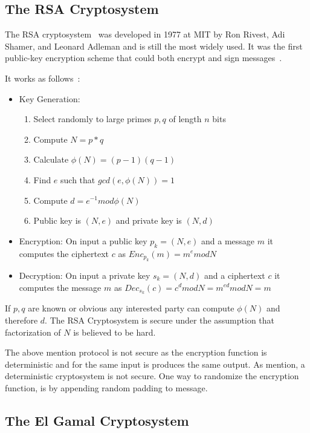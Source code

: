 \subsection{The RSA Cryptosystem}
\label{preliminaries:pub:rsa}

The RSA cryptosystem~\cite{rsa} was developed in 1977 at MIT by Ron Rivest, Adi Shamer, and Leonard Adleman and is still the most widely used. It was the first public-key encryption scheme that could both encrypt and sign messages~\cite{kiagias:crypto}.

It works as follows~\cite{Katz:2014:IMC:2700550, kiagias:crypto}:

\begin{itemize}
  \item Key Generation:
    \begin{enumerate}
      \item Select randomly to large primes $p, q$ of length $n$ bits
      \item Compute $N = p*q$
      \item Calculate $\phi(N) = (p - 1)(q - 1)$
      \item Find $e$ such that $gcd(e, \phi(N)) = 1$
      \item Compute $d = e^{-1} mod\phi(N)$
      \item Public key is $(N, e)$ and private key is $(N, d)$
    \end{enumerate}
  \item Encryption: On input a public key $p_k = (N, e)$ and a message $m$ it computes the ciphertext $c$ as $ Enc_{p_k}(m) = m^{e}modN$
  \item Decryption: On input a private key $s_k = (N, d)$ and a ciphertext $c$ it computes the message $m$ as $ Dec_{s_k}(c) = c^{d}modN = m^{ed}modN = m$
\end{itemize}

If $p, q$ are known or obvious any interested party can compute $\phi(N)$ and therefore $d$. The RSA Cryptosystem is secure under the assumption that factorization of $N$ is believed to be hard.

The above mention protocol is not secure as the encryption function is deterministic and for the same input is produces the same output. As mention, a deterministic cryptosystem is not secure. One way to randomize the encryption function, is by appending random padding to message.

\subsection{The El Gamal Cryptosystem}
\label{preliminaries:pub:el_gamal}

